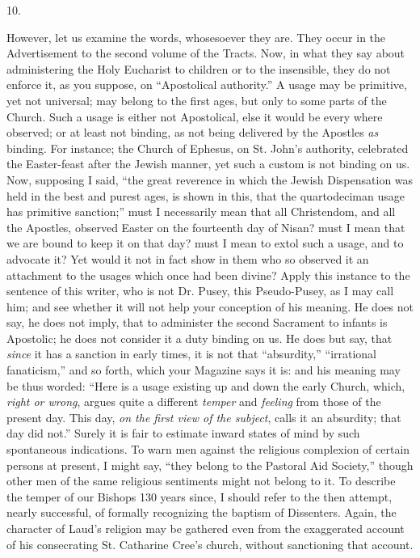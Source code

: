 10.

However, let us examine the words, whosesoever
they are. They occur in the Advertisement to the second volume of the
Tracts. Now, in what they say about administering the Holy Eucharist
to children or to the insensible, they do not enforce it, as you
suppose, on ``Apostolical authority.'' A usage may be primitive, yet not
universal; may belong to the first ages, but only to some parts of the
Church. Such a usage is either not Apostolical, else it would be every
where observed; or at least not binding, as not being delivered by the
Apostles \emph{as} binding. For instance; the Church of Ephesus, on St. John's
authority, celebrated the Easter-feast after the Jewish manner, yet
such a custom is not binding on us. Now, supposing I said, ``the great
reverence in which the Jewish Dispensation was held in the best and
purest ages, is shown in this, that the quartodeciman usage has
primitive sanction;'' must I necessarily mean that all Christendom, and
all the Apostles, observed Easter on the fourteenth day of Nisan?
must I mean that we are bound to keep it on that day? must I mean to
extol such a usage, and to advocate it? Yet would it not in fact show
in them who so observed it an attachment to the usages which once had
been divine? Apply this instance to the sentence of this writer, who
is not Dr. Pusey, this Pseudo-Pusey, as I may call him; and see
whether it will not help your conception of his meaning. He does not
say, he does not imply, that to administer the second Sacrament to
infants is Apostolic; he does not consider it a duty binding on us. He
does but say, that \emph{since} it has a sanction in early times, it is not
that ``absurdity,'' ``irrational fanaticism,'' and so forth, which your
Magazine says it is: and his meaning may be thus worded: ``Here is a
usage existing up and down the early Church, which, \emph{right or wrong},
argues quite a different \emph{temper} and \emph{feeling} from those
of the present day. This day, \emph{on the first view of the subject},
calls it an absurdity; that day did not.'' Surely it is fair to
estimate inward states of mind by such spontaneous indications. To
warn men against the religious complexion of certain persons at
present, I might say, ``they belong to the Pastoral Aid Society,''
though other men of the same religious sentiments might not belong to
it. To describe the temper of our Bishops 130 years since, I should
refer to the then attempt, nearly successful, of formally recognizing
the baptism of Dissenters. Again, the character of Laud's religion may
be gathered even from the exaggerated account of his consecrating St.
Catharine Cree's church, without sanctioning that account.

